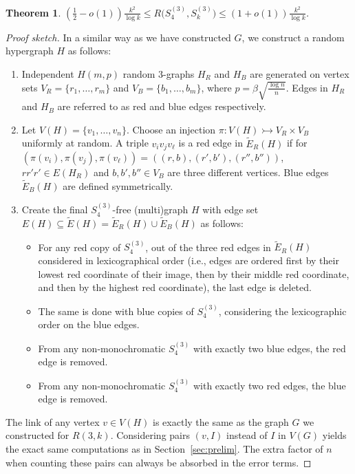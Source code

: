 \documentclass{article}
\newtheorem{theorem}{Theorem}[section]
\begin{document}
\begin{theorem}\label{thm:hyper}
    $\left(\frac12-o(1)\right)\frac{k^2}{\log k}\le R\bigl(S_4^{(3)},S_k^{(3)}\bigr)\le \left(1+o(1)\right)\frac{k^2}{\log k}$.
\end{theorem}
\begin{proof}[Proof sketch]
In a similar way as we have constructed $G$, we construct a random hypergraph $H$ as follows:



\begin{enumerate} 
\item Independent $H({m},p)$ random $3$-graphs $H_{R}$ and $H_{B}$ are generated on vertex sets $V_R = \{r_1, \dots, r_{{m}}\}$ and $V_B = \{b_1, \dots, b_{{m}}\}$, where $p = \beta \sqrt{\frac{\log n}{n}}.$  Edges in $H_R$ and $H_B$ are referred to as red and blue edges respectively.  
 \item Let $V(H)=\{v_1,\ldots,v_n\}$. Choose an injection $\pi:V(H)\rightarrowtail V_R \times V_B$ uniformly at random. A triple $v_iv_jv_\ell$ is a red edge in $\tilde{E}_R(H)$ if for $(\pi(v_i),\pi(v_j),\pi(v_\ell))=((r,b),(r',b'),(r'',b''))$, $rr'r'\in E(H_R)$ and $b,b',b''\in V_B$ are three different vertices. Blue edges $\tilde{E}_B(H)$ are defined symmetrically.
\item Create the final $S_4^{(3)}$-free (multi)graph $H$ with edge set $E(H)\subseteq \tilde{E}(H)=\tilde{E}_R(H)\cup \tilde{E}_B(H)$ as follows:  
\begin{itemize} 
	\item For any red copy of $S_4^{(3)}$, out of the three red edges in $\tilde{E}_R(H)$ considered in lexicographical order (i.e., edges are ordered first by their lowest red coordinate of their image, then by their middle red coordinate, and then by the highest red coordinate), the last edge is deleted.  
	\item The same is done with blue copies of $S_4^{(3)}$, considering the lexicographic order on the blue edges.  
        \item From any non-monochromatic $S_4^{(3)}$ with exactly two blue edges, the red edge is removed.
	\item From any non-monochromatic $S_4^{(3)}$ with exactly two red edges, the blue edge is removed.
\end{itemize}  
\end{enumerate} 


The link of any vertex $v\in V(H)$ is exactly the same as the graph $G$ we constructed for $R(3,k)$. Considering pairs $(v,I)$ instead of $I$ in $V(G)$ yields the exact same computations as in Section~\ref{sec:prelim}. The extra factor of $n$ when counting these pairs can always be absorbed in the error terms.


\end{proof}
\end{document}
